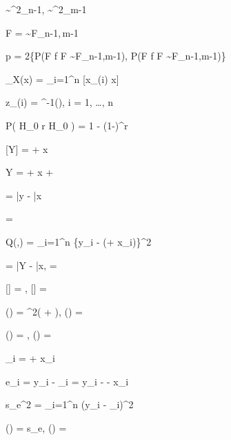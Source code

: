 \documentclass{minimal}
\begin{document}
 \sim \chi^2_{n-1}, \quad {} \sim \chi^2_{m-1}

F =  \sim F_{n-1,\,m-1}

p = 2\min\!\left\{P(F \leq f \mid F \sim F_{n-1,m-1}),\; P(F \geq f \mid F \sim F_{n-1,m-1})\right\}

_X(x) =  \sum_{i=1}^n [x_{(i)} \leq x]

z_{(i)} = \Phi^{-1}\!\left(\right), \quad i = 1, \ldots, n

P( H_0  r  \mid H_0 )
= 1 - (1-\alpha)^r

[Y] = \alpha + \beta x

Y = \alpha + \beta x + \epsilon

\hat{\alpha} = \bar{y} - \hat{\beta}\bar{x}

\hat{\beta} = 

Q(\alpha,\beta) = \sum_{i=1}^n \{y_i - (\alpha + \beta x_i)\}^2

\hat{\alpha} = \bar{Y} - \hat{\beta}\bar{x}, \qquad
\hat{\beta} = 

[\hat{\beta}] = \beta, \quad {}[\hat{\alpha}] = \alpha

(\hat{\alpha}) = \sigma^2\!\left( + \right), \qquad
{}(\hat{\beta}) = 

(\hat{\alpha}) = \sigma{}, \qquad
{}(\hat{\beta}) = 

_i = \hat{\alpha} + \hat{\beta} x_i

e_i = y_i - _i = y_i - \hat{\alpha} - \hat{\beta} x_i

s_e^2 =  \sum_{i=1}^n (y_i - _i)^2

(\hat{\alpha}) = s_e, \qquad
{}(\hat{\beta}) = 
\end{document}
